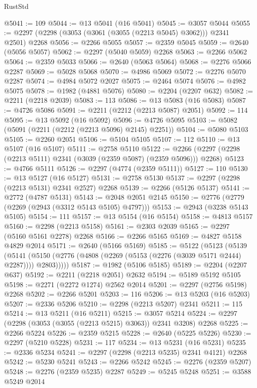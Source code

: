 \begin{lexlean}{RustStd}
\begin{coremodule}
@5041 := 109
@5044 := @13 @5041 (@16 @5041)
@5045 := @3057 @5044
@5055 := @2297 (@2298 (@3053 (@3061 (@3055 (@2213 @5045) @3062))) @2341 @2501) @2268
@5056 := @2266 @5055
@5057 := @2359 @5045
@5059 := @2640 (@5056 @5057)
@5062 := @2297 (@5040 @5059) @2268
@5063 := @2266 @5062
@5064 := @2359 @5033
@5066 := @2640 (@5063 @5064)
@5068 := @2276 @5066 @2287
@5069 := @5028 @5068
@5070 := @4986 @5069
@5072 := @2276 @5070 @2287
@5074 := @4984 @5072 @2027
@5075 := @2464 @5074
@5076 := @4982 @5075
@5078 := @1982 (@4881 @5076)
@5080 := @2204 (@2207 @632)
@5082 := @2211 (@2218 @2039)
@5083 := 113
@5086 := @13 @5083 (@16 @5083)
@5087 := @4726 @5086
@5091 := @2211 (@2212 (@2213 @5087) @2051)
@5092 := 114
@5095 := @13 @5092 (@16 @5092)
@5096 := @4726 @5095
@5103 := @5082 (@5091 (@2211 (@2212 (@2213 @5096) @2145) @2251))
@5104 := @5080 @5103
@5105 := @2260 @2051
@5106 := @5104 @5105
@5107 := 112
@5110 := @13 @5107 (@16 @5107)
@5111 := @2758 @5110
@5122 := @2266 (@2297 (@2298 (@2213 @5111) @2341 (@3039 (@2359 @5087) (@2359 @5096))) @2268)
@5123 := @4766 @5111
@5126 := @2297 (@4774 (@2359 @5111))
@5127 := 110
@5130 := @13 @5127 (@16 @5127)
@5131 := @2758 @5130
@5137 := @2297 (@2298 (@2213 @5131) @2341 @2527) @2268
@5139 := @2266 (@5126 @5137)
@5141 := @2772 (@4787 @5131)
@5143 := @2048 @2051 @2145
@5150 := @2776 (@2779 (@2269 (@2943 (@3312 @5143 @5105) @4797)))
@5153 := @2943 (@3238 @5143 @5105)
@5154 := 111
@5157 := @13 @5154 (@16 @5154)
@5158 := @4813 @5157
@5160 := @2298 (@2213 @5158)
@5161 := @2303 @2039
@5165 := @2297 (@5160 @5161 @2278) @2268
@5166 := @2266 @5165
@5169 := @4827 @5158 @4829 @2014
@5171 := @2640 (@5166 @5169)
@5185 := @5122
    (@5123
      (@5139
        (@5141 (@5150 (@2776 (@4808 (@2269 (@5153 (@2276 (@3039 @5171 @2444) @2287)))) @2803)))))
@5187 := @1982 (@5106 @5185)
@5189 := @2204 (@2207 @637)
@5192 := @2211 (@2218 @2051) @2632
@5194 := @5189 @5192 @5105
@5198 := @2271 (@2272 @1274) @2562 @2014
@5201 := @2297 (@2756 @5198) @2268
@5202 := @2266 @5201
@5203 := 116
@5206 := @13 @5203 (@16 @5203)
@5207 := @2336 @5206
@5210 := @2298 (@2213 @5207) @2341
@5211 := 115
@5214 := @13 @5211 (@16 @5211)
@5215 := @3057 @5214
@5224 := @2297 (@2298 (@3053 (@3055 (@2213 @5215) @3063)) @2341 @3208) @2268
@5225 := @2266 @5224
@5226 := @2359 @5215
@5228 := @2640 (@5225 @5226)
@5230 := @2297 (@5210 @5228)
@5231 := 117
@5234 := @13 @5231 (@16 @5231)
@5235 := @2336 @5234
@5241 := @2297 (@2298 (@2213 @5235) @2341 @4121) @2268
@5242 := @5230 @5241
@5243 := @2266 @5242
@5245 := @2276 (@2359 @5207)
@5248 := @2276 (@2359 @5235) @2287
@5249 := @5245 @5248
@5251 := @3588 @5249 @2014

\end{coremodule}
\end{lexlean}
